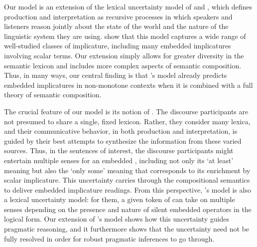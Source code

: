 \documentclass[leqno]{article}
\begin{document}

Our model is an extension of the lexical uncertainty model of
\citet{Bergen:Goodman:Levy:2012} and \citet{Bergen:Levy:Goodman:2014},
which defines production and interpretation as recursive processes in
which speakers and listeners reason jointly about the state of the
world and the nature of the linguistic system they are
using. \citeauthor{Bergen:Levy:Goodman:2014} show that this model
captures a wide range of well-studied classes of implicature,
including many embedded implicatures involving scalar terms. Our
extension simply allows for greater diversity in the semantic lexicon
and includes more complex aspects of semantic composition. Thus, in
many ways, our central finding is that
\citeauthor{Bergen:Levy:Goodman:2014}'s model already predicts
embedded implicatures in non-monotone contexts when it is combined
with a full theory of semantic composition.


The crucial feature of our model is its notion of . The discourse participants are not presumed to share a
single, fixed lexicon. Rather, they consider many lexica, and their
communicative behavior, in both production and interpretation, is
guided by their best attempts to synthesize the information from these
varied sources. Thus, in the sentences of interest, the discourse
participants might entertain multiple senses for an embedded
, including not only its `at least' meaning but also the
`only some' meaning that corresponds to its enrichment by scalar
implicature. This uncertainty carries through the compositional
semantics to deliver embedded implicature readings. From this
perspective, \citeauthor{ChierchiaFoxSpector08}'s model is also a
lexical uncertainty model: for them, a given token of  can
take on multiple senses depending on the presence and nature of silent
embedded operators in the logical form. Our extension of
\citeauthor{Bergen:Levy:Goodman:2014}'s model shows how this
uncertainty guides pragmatic reasoning, and it furthermore shows that
the uncertainty need not be fully resolved in order for robust
pragmatic inferences to go through.

\end{document}
